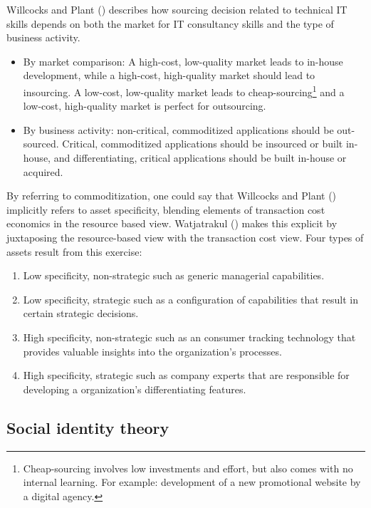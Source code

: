 \documentclass[
  man,floatsintext]{apa6}
\providecommand{\tightlist}{%
  \setlength{\itemsep}{0pt}\setlength{\parskip}{0pt}}
\begin{document}
Willcocks and Plant () describes how sourcing decision related to technical IT skills depends on both the market for IT consultancy skills and the type of business activity.

\begin{itemize}
\tightlist
\item
  By market comparison: A high-cost, low-quality market leads to in-house development, while a high-cost, high-quality market should lead to insourcing. A low-cost, low-quality market leads to cheap-sourcing\footnote{Cheap-sourcing involves low investments and effort, but also comes with no internal learning. For example: development of a new promotional website by a digital agency.} and a low-cost, high-quality market is perfect for outsourcing.
\item
  By business activity: non-critical, commoditized applications should be out-sourced. Critical, commoditized applications should be insourced or built in-house, and differentiating, critical applications should be built in-house or acquired.
\end{itemize}

By referring to commoditization, one could say that Willcocks and Plant () implicitly refers to asset specificity, blending elements of transaction cost economics in the resource based view. Watjatrakul () makes this explicit by juxtaposing the resource-based view with the transaction cost view. Four types of assets result from this exercise:

\begin{enumerate}
\def\labelenumi{\arabic{enumi}.}
\tightlist
\item
  Low specificity, non-strategic such as generic managerial capabilities.
\item
  Low specificity, strategic such as a configuration of capabilities that result in certain strategic decisions.
\item
  High specificity, non-strategic such as an consumer tracking technology that provides valuable insights into the organization's processes.
\item
  High specificity, strategic such as company experts that are responsible for developing a organization's differentiating features.
\end{enumerate}

\subsection{Social identity theory}\label{social-identity-theory}
\end{document}
